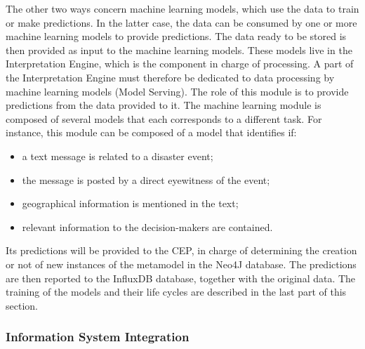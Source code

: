 The other two ways concern machine learning models, which use the data to train or make predictions.
In the latter case, the data can be consumed by one or more machine learning models to provide predictions.
The data ready to be stored is then provided as input to the machine learning models.
These models live in the Interpretation Engine, which is the component in charge of processing.
A part of the Interpretation Engine must therefore be dedicated to data processing by machine learning models (Model Serving).
The role of this module is to provide predictions from the data provided to it.
The machine learning module is composed of several models that each corresponds to a different task.
For instance, this module can be composed of a model that identifies if:

\begin{itemize}
    \item a text message is related to a disaster event;
    \item the message is posted by a direct eyewitness of the event;
    \item geographical information is mentioned in the text;
    \item relevant information to the decision-makers are contained.
\end{itemize}

Its predictions will be provided to the CEP, in charge of determining the creation or not of new instances of the metamodel in the Neo4J database.
The predictions are then reported to the InfluxDB database, together with the original data.
The training of the models and their life cycles are described in the last part of this section.

\subsubsection{Information System Integration}
